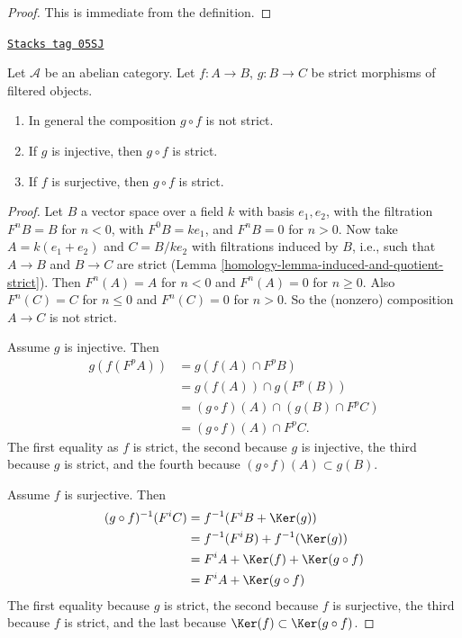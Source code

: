 \begin{proof}
This is immediate from the definition.
\end{proof}

\begin{lemma}
\label{homology-lemma-composition-strict}
\href{https://stacks.math.columbia.edu/tag/05SJ}{\texttt{Stacks tag 05SJ}}

Let $\mathcal{A}$ be an abelian category. Let $f : A \to B$, $g : B \to C$
be strict morphisms of filtered objects.
\begin{enumerate}
\item In general the composition $g \circ f$ is not strict.
\item If $g$ is injective, then $g \circ f$ is strict.
\item If $f$ is surjective, then $g \circ f$ is strict.
\end{enumerate}
\end{lemma}

\begin{proof}

Let $B$ a vector space over a field $k$ with basis $e_1, e_2$, with the
filtration $F^nB = B$ for $n < 0$, with $F^0B = ke_1$, and $F^nB = 0$ for
$n > 0$. Now take $A = k(e_1 + e_2)$ and $C = B/ke_2$ with filtrations
induced by $B$, i.e., such that $A \to B$ and $B \to C$ are strict
(Lemma \ref{homology-lemma-induced-and-quotient-strict}).
Then $F^n(A) = A$ for $n < 0$ and $F^n(A) = 0$ for $n \geq 0$.
Also $F^n(C) = C$ for $n \leq 0$ and $F^n(C) = 0$ for $n > 0$.
So the (nonzero) composition $A \to C$ is not strict.

\medskip\noindent
Assume $g$ is injective. Then
\begin{align*}
g(f(F^pA)) & = g(f(A) \cap F^pB) \\
& = g(f(A)) \cap g(F^p(B)) \\
& = (g \circ f)(A) \cap (g(B) \cap F^pC) \\
& = (g \circ f)(A) \cap F^pC.
\end{align*}
The first equality as $f$ is strict, the second because $g$ is injective,
the third because $g$ is strict, and the fourth because
$(g \circ f)(A) \subset g(B)$.

\medskip\noindent
Assume $f$ is surjective. Then
\begin{align*}
(g \circ f)^{-1}(F^iC) & = f^{-1}(F^iB + \Ker(g)) \\
& = f^{-1}(F^iB) + f^{-1}(\Ker(g)) \\
& = F^iA + \Ker(f) + \Ker(g \circ f) \\
& = F^iA + \Ker(g \circ f)
\end{align*}
The first equality because $g$ is strict, the second because $f$ is
surjective, the third because $f$ is strict, and the last because
$\Ker(f) \subset \Ker(g \circ f)$.
\end{proof}

